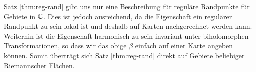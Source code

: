 \begin{rem}
  \label{rem:reg-rand}
  Satz \ref{thm:reg-rand} gibt uns nur eine Beschreibung für reguläre
  Randpunkte für Gebiete in $\mathbb{C}$. Dies ist jedoch ausreichend, da die
  Eigenschaft ein regulärer Randpunkt zu sein lokal ist und deshalb
  auf Karten nachgerechnet werden kann. Weiterhin ist die Eigenschaft
  harmonisch zu sein invariant unter biholomorphen Transformationen,
  so dass wir das obige $\beta$ einfach auf einer Karte angeben
  können. Somit überträgt sich Satz \ref{thm:reg-rand} direkt auf
  Gebiete beliebiger Riemannscher Flächen.
\end{rem}



